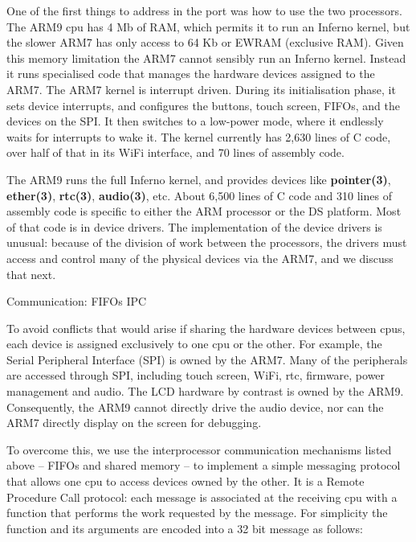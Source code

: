 \documentclass[11pt]{p9article}
\makeatletter
\renewcommand\subsection{\@startsection {subsection}{1}{\z@} {3pt}
{1pt} {\normalfont\normalsize\bfseries}}
\makeatother
\begin{document}
One of the first things to address in the port was how to use the two processors.
The ARM9 cpu has 4 Mb of RAM, which permits it to run an Inferno kernel, but
the slower ARM7 has only access to 64 Kb or EWRAM (exclusive RAM).
Given this memory limitation the ARM7 cannot sensibly run an Inferno kernel.
Instead it runs specialised code that manages the hardware devices assigned to the ARM7.
The ARM7 kernel is interrupt driven.
During its initialisation phase, it sets device interrupts, and configures the buttons, touch
screen, FIFOs, and the devices on the SPI.
It then switches to a low-power mode, where it endlessly waits for interrupts to wake it.
The kernel currently has 2,630 lines of C code, over half of that in its WiFi interface, and 70 lines of assembly code.

The ARM9 runs the full Inferno kernel, and
provides devices like \textbf{pointer(3)}, \textbf{ether(3)}, \textbf{rtc(3)}, \textbf{audio(3)}, etc. 
About 6,500 lines of C code and 310 lines of assembly code is specific to either
the ARM processor or the DS platform. Most of that code is in device drivers.
The implementation of the device drivers is unusual: 
because of the division of work between the processors,
the drivers must access and control many of the physical devices via the ARM7,
and we discuss that next.

\subsection{Communication: FIFOs IPC}

To avoid conflicts that would arise if sharing the hardware devices between cpus,
each device is assigned exclusively to one cpu or the other.
For example, the Serial Peripheral Interface (SPI) is owned by the ARM7.
Many of the peripherals are accessed through SPI, including
touch screen, WiFi, rtc, firmware, power management and audio.
The LCD hardware by contrast is owned by the ARM9.
Consequently, the ARM9 cannot directly drive the audio device,
nor can the ARM7 directly display on the screen for debugging.

To overcome this,  we use the interprocessor communication mechanisms listed above --
FIFOs and shared memory --
to implement a simple messaging protocol that allows one cpu to access
devices owned by the other.
It is a Remote Procedure Call protocol: each message is associated
at the receiving cpu with a function that performs the work requested by the message.
For simplicity the function and its arguments are encoded 
into a 32 bit message as follows:
\end{document}
